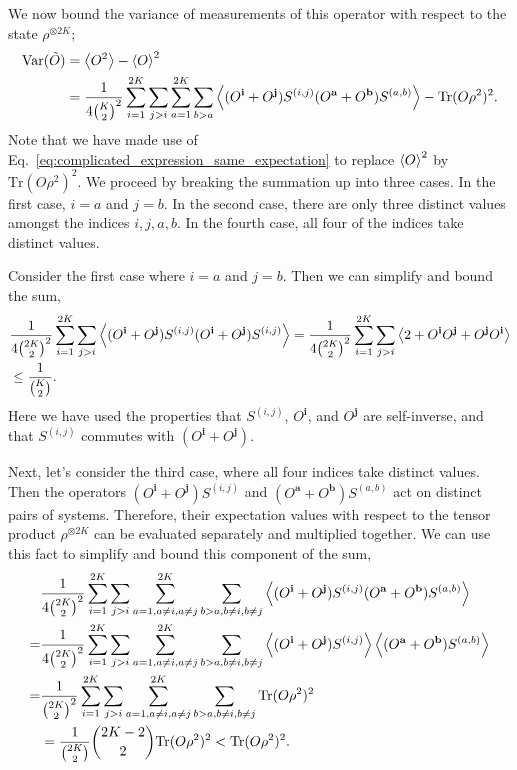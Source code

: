 \documentclass[
amsmath,
amssymb,
aps,
pra,
reprint,
twocolumn,
superscriptaddress,
longbibliography,
showkeys,
floatfix
]{revtex4-1}
\def\tr{\mathrm{Tr}}
\newcommand{\eq}[1]{Eq.~\hyperref[eq:#1]{\ref*{eq:#1}}}
\begin{document}
We now bound the variance of measurements of this operator with
respect to the state \(\rho^{\otimes 2K}\);
\begin{align}
  \textrm{Var}(\tilde{O}) &= \ev{O^2} - \ev{O}^2 \\
                 &= \frac{1}{4\binom{K}{2}^2} \sum_{i=1}^{2K} \sum_{j > i} \sum_{a=1}^{2K} \sum_{b>a} \ev{ (O^\textbf{i} + O^\textbf{j})S^{(i, j)}(O^\textbf{a} + O^\textbf{b}) S^{(a, b)}} - \tr(O \rho^2)^2.
\end{align}
Note that we have made use of \eq{complicated_expression_same_expectation} to
replace \(\ev{O}^2\) by \(\tr(O \rho^2)^2\).
We proceed by breaking the summation up into three cases. 
In the first case, \(i = a\) and \(j = b\). 
In the second case, there are only three distinct values amongst the indices
\(i, j, a, b\). 
In the fourth case, all four of the indices take distinct values.

Consider the first case where \(i=a\) and \(j=b\). 
Then we can simplify and bound the sum,
\begin{align}
  & \frac{1}{4\binom{2K}{2}^2} \sum_{i=1}^{2K} \sum_{j > i} \ev{ (O^\textbf{i} + O^\textbf{j})S^{(i,
    j)}(O^\textbf{i} + O^\textbf{j}) S^{(i, j)}} =
    \frac{1}{4\binom{2K}{2}^2} \sum_{i=1}^{2K} \sum_{j > i} \ev{2 + O^\textbf{i} O^\textbf{j} + O^\textbf{j} O^\textbf{i}} \\
  & \leq \frac{1}{\binom{K}{2}}.
\end{align}
Here we have used the properties that \(S^{(i, j)}\), \(O^{\textbf{i}}\), and
\(O^{\textbf{j}}\) are self-inverse, and that
\(S^{(i, j)}\) commutes with \((O^\textbf{i} + O^{\textbf{j}})\).

Next, let's consider the third case, where all four indices take distinct
values. 
Then the operators \((O^\textbf{i} + O^\textbf{j})S^{(i, j)}\) and
\((O^\textbf{a} + O^\textbf{b})S^{(a, b)}\) act on distinct pairs of systems. 
Therefore, their expectation values with respect to the tensor product
\(\rho^{\otimes 2K}\) can be evaluated separately and multiplied together. 
We can use this fact to simplify and bound this component of the sum,
\begin{align}
  & \frac{1}{4\binom{2K}{2}^2} \sum_{i=1}^{2K} \sum_{j > i} \sum_{a=1, a\neq i, a\neq j}^{2K} \sum_{b>a, b\neq i, b\neq j} \ev{ (O^\textbf{i} + O^\textbf{j})S^{(i, j)}(O^\textbf{a} + O^\textbf{b}) S^{(a, b)}}\\
  =& \frac{1}{4\binom{2K}{2}^2} \sum_{i=1}^{2K} \sum_{j > i} \sum_{a=1, a\neq i,
     a\neq j}^{2K} \sum_{b>a, b\neq i, b\neq j} \ev{ (O^\textbf{i} + O^\textbf{j})S^{(i, j)}}\ev{(O^\textbf{a}
     + O^\textbf{b}) S^{(a, b)}} \\
  =& \frac{1}{\binom{2K}{2}^2}
     \sum_{i=1}^{2K} \sum_{j > i}
     \sum_{a=1, a\neq i, a\neq
     j}^{2K} \sum_{b>a, b\neq i,
     b\neq j}  \tr(O \rho^2)^2\\
  & = \frac{1}{\binom{2K}{2}} \binom{2K - 2}{2} \tr(O \rho^2)^2 < \tr(O\rho^2)^2.
\end{align}
\end{document}
